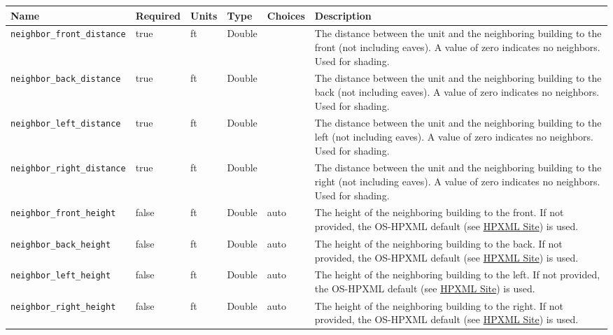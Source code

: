 \begin{longtable}[]{@{}llllll@{}}
\toprule\noalign{}
Name & Required & Units & Type & Choices & Description \\
\midrule\noalign{}
\endhead
\bottomrule\noalign{}
\endlastfoot
\texttt{neighbor\_front\_distance} & true & ft & Double & & The distance
between the unit and the neighboring building to the front (not
including eaves). A value of zero indicates no neighbors. Used for
shading. \\
\texttt{neighbor\_back\_distance} & true & ft & Double & & The distance
between the unit and the neighboring building to the back (not including
eaves). A value of zero indicates no neighbors. Used for shading. \\
\texttt{neighbor\_left\_distance} & true & ft & Double & & The distance
between the unit and the neighboring building to the left (not including
eaves). A value of zero indicates no neighbors. Used for shading. \\
\texttt{neighbor\_right\_distance} & true & ft & Double & & The distance
between the unit and the neighboring building to the right (not
including eaves). A value of zero indicates no neighbors. Used for
shading. \\
\texttt{neighbor\_front\_height} & false & ft & Double & auto & The
height of the neighboring building to the front. If not provided, the
OS-HPXML default (see
\href{https://openstudio-hpxml.readthedocs.io/en/v1.7.0/workflow_inputs.html\#hpxml-site}{HPXML
Site}) is used. \\
\texttt{neighbor\_back\_height} & false & ft & Double & auto & The
height of the neighboring building to the back. If not provided, the
OS-HPXML default (see
\href{https://openstudio-hpxml.readthedocs.io/en/v1.7.0/workflow_inputs.html\#hpxml-site}{HPXML
Site}) is used. \\
\texttt{neighbor\_left\_height} & false & ft & Double & auto & The
height of the neighboring building to the left. If not provided, the
OS-HPXML default (see
\href{https://openstudio-hpxml.readthedocs.io/en/v1.7.0/workflow_inputs.html\#hpxml-site}{HPXML
Site}) is used. \\
\texttt{neighbor\_right\_height} & false & ft & Double & auto & The
height of the neighboring building to the right. If not provided, the
OS-HPXML default (see
\href{https://openstudio-hpxml.readthedocs.io/en/v1.7.0/workflow_inputs.html\#hpxml-site}{HPXML
Site}) is used. \\
\end{longtable}

